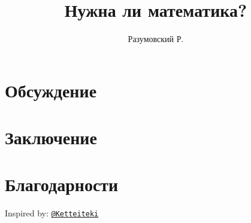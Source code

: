 \documentclass[12pt,a4paper]{article}
\title{Нужна ли математика?}
\date{} %
\author{Разумовский Р.}
\numberwithin{equation}{section}
\begin{document}
    \maketitle

    \begin{abstract}
        
    \end{abstract}


    \section{Обсуждение} \label{sec:introduction}
    


    \section{Заключение}\label{sec:conclusions}
    

    \section{Благодарности}\label{sec:ack}

    Inspired by: \href{https://github.com/Ketteiteki}{\texttt{@Ketteiteki}}

    
    
\end{document}
